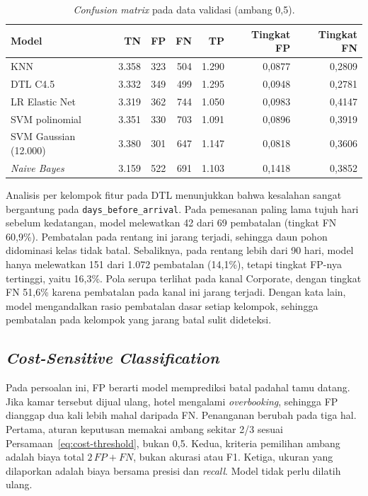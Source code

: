 \begin{table}[htbp]
    \centering
    \small
    \begin{tabular}{@{}l r r r r r r@{}}
        \toprule
        Model & TN & FP & FN & TP & Tingkat FP & Tingkat FN \\
        \midrule
        KNN & 3.358 & 323 & 504 & 1.290 & 0,0877 & 0,2809 \\
        DTL C4.5 & 3.332 & 349 & 499 & 1.295 & 0,0948 & 0,2781 \\
        LR Elastic Net & 3.319 & 362 & 744 & 1.050 & 0,0983 & 0,4147 \\
        SVM polinomial & 3.351 & 330 & 703 & 1.091 & 0,0896 & 0,3919 \\
        SVM Gaussian (12.000) & 3.380 & 301 & 647 & 1.147 & 0,0818 & 0,3606 \\
        \textit{Naive Bayes} & 3.159 & 522 & 691 & 1.103 & 0,1418 & 0,3852 \\
        \bottomrule
    \end{tabular}
    \caption{\textit{Confusion matrix} pada data validasi (ambang 0,5).}
    \label{tab:error}
\end{table}

Analisis per kelompok fitur pada DTL menunjukkan bahwa kesalahan sangat bergantung pada \texttt{days\_before\_arrival}. Pada pemesanan paling lama tujuh hari sebelum kedatangan, model melewatkan 42 dari 69 pembatalan (tingkat FN 60,9\%). Pembatalan pada rentang ini jarang terjadi, sehingga daun pohon didominasi kelas tidak batal. Sebaliknya, pada rentang lebih dari 90 hari, model hanya melewatkan 151 dari 1.072 pembatalan (14,1\%), tetapi tingkat FP-nya tertinggi, yaitu 16,3\%. Pola serupa terlihat pada kanal Corporate, dengan tingkat FN 51,6\% karena pembatalan pada kanal ini jarang terjadi. Dengan kata lain, model mengandalkan rasio pembatalan dasar setiap kelompok, sehingga pembatalan pada kelompok yang jarang batal sulit dideteksi.

\subsection{\textit{Cost-Sensitive Classification}}
Pada persoalan ini, FP berarti model memprediksi batal padahal tamu datang. Jika kamar tersebut dijual ulang, hotel mengalami \textit{overbooking}, sehingga FP dianggap dua kali lebih mahal daripada FN. Penanganan berubah pada tiga hal. Pertama, aturan keputusan memakai ambang sekitar 2/3 sesuai Persamaan~\ref{eq:cost-threshold}, bukan 0,5. Kedua, kriteria pemilihan ambang adalah biaya total $2\,FP+FN$, bukan akurasi atau F1. Ketiga, ukuran yang dilaporkan adalah biaya bersama presisi dan \textit{recall}. Model tidak perlu dilatih ulang.

